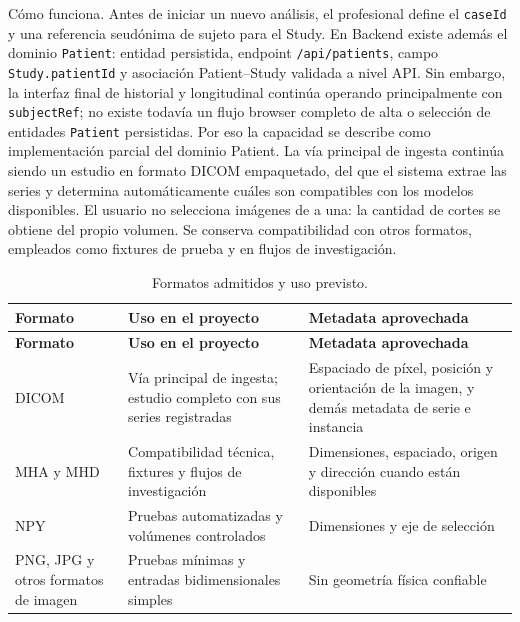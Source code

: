 Cómo funciona. Antes de iniciar un nuevo análisis, el profesional define el \texttt{caseId} y una referencia seudónima de sujeto para el Study. En Backend existe además el dominio \texttt{Patient}: entidad persistida, endpoint \texttt{/api/patients}, campo \texttt{Study.patientId} y asociación Patient--Study validada a nivel API. Sin embargo, la interfaz final de historial y longitudinal continúa operando principalmente con \texttt{subjectRef}; no existe todavía un flujo browser completo de alta o selección de entidades \texttt{Patient} persistidas. Por eso la capacidad se describe como implementación parcial del dominio Patient. La vía principal de ingesta continúa siendo un estudio en formato DICOM empaquetado, del que el sistema extrae las series y determina automáticamente cuáles son compatibles con los modelos disponibles. El usuario no selecciona imágenes de a una: la cantidad de cortes se obtiene del propio volumen. Se conserva compatibilidad con otros formatos, empleados como fixtures de prueba y en flujos de investigación.

{\small
\setlength{\LTleft}{0pt}
\setlength{\LTright}{0pt}
\setlength{\tabcolsep}{3pt}
\renewcommand{\arraystretch}{1.18}
\begin{longtable}{>{\raggedright\arraybackslash}p{} >{\raggedright\arraybackslash}p{} >{\raggedright\arraybackslash}p{}}
\caption{Formatos admitidos y uso previsto.}\label{tab:cap-formatos-ingesta}\\
\hline
\textbf{Formato} & \textbf{Uso en el proyecto} & \textbf{Metadata aprovechada} \\
\hline
\endfirsthead
\hline
\textbf{Formato} & \textbf{Uso en el proyecto} & \textbf{Metadata aprovechada} \\
\hline
\endhead
\hline
\endfoot
DICOM & Vía principal de ingesta; estudio completo con sus series registradas & Espaciado de píxel, posición y orientación de la imagen, y demás metadata de serie e instancia \\
MHA y MHD & Compatibilidad técnica, fixtures y flujos de investigación & Dimensiones, espaciado, origen y dirección cuando están disponibles \\
NPY & Pruebas automatizadas y volúmenes controlados & Dimensiones y eje de selección \\
PNG, JPG y otros formatos de imagen & Pruebas mínimas y entradas bidimensionales simples & Sin geometría física confiable \\
\hline
\end{longtable}
}

